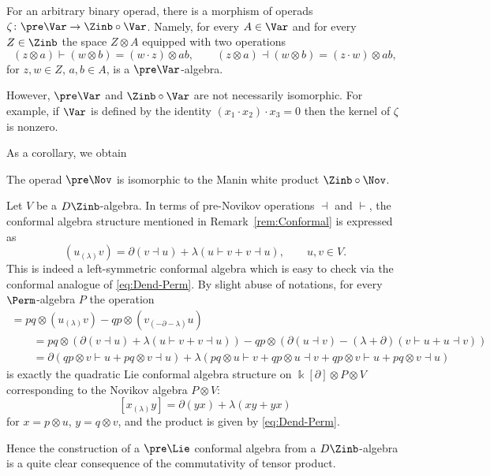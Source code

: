 \begin{Remark}
For an arbitrary binary operad,
there is a morphism of operads
$\zeta\colon \pre\Var \to \Zinb\circ \Var $. Namely,
for every $A\in \Var $ and for every $Z\in \Zinb$
the space $Z\otimes A$ equipped with two operations
\[
(z\otimes a)\vdash (w\otimes b) = (w\cdot z)\otimes ab,
\qquad
(z\otimes a)\dashv (w\otimes b) = (z\cdot w)\otimes ab,
\]
for $z,w\in Z$, $a,b\in A$, is a $\pre\Var $-algebra.

However, $\pre\Var $ and $\Zinb\circ \Var $ are
not necessarily isomorphic. For example,
if $\Var $ is defined by the identity $(x_1\cdot x_2)\cdot x_3=0$
then the kernel of $\zeta $ is nonzero.
\end{Remark}

As a corollary, we obtain

\begin{Proposition}%
The operad $\pre\Nov $
is isomorphic to the Manin white product $\Zinb\circ \Nov$.
\end{Proposition}

\begin{Remark}
Let $V$ be a $D\Zinb$-algebra.
In terms of pre-Novikov operations $\dashv$ and $\vdash$, the conformal algebra structure mentioned in
Remark~\ref{rem:Conformal} is expressed as
\[
(u_{(\lambda)} v) = \partial (v\dashv u) + \lambda (u\vdash v + v\dashv u),
\qquad u,v\in V.
\]
This is indeed a left-symmetric conformal algebra which is easy
to check via the conformal analogue of \eqref{eq:Dend-Perm}.
By slight abuse of notations,
for every $\Perm $-algebra $P$ the operation
%
\begin{gather*}
[(p\otimes u)_{(\lambda) } (q\otimes v)]
= pq \otimes (u_{(\lambda )} v) - qp\otimes (v_{(-\partial-\lambda )} u) \\
\qquad{}=pq\otimes (\partial (v\dashv u) + \lambda (u\vdash v + v\dashv u))
-qp\otimes (\partial (u\dashv v) - (\lambda+\partial) (v\vdash u + u\dashv v))\\
\qquad{}=\partial (qp\otimes v\vdash u+pq\otimes v\dashv u)
+\lambda (pq\otimes u\vdash v +qp\otimes u\dashv v
+ qp\otimes v\vdash u + pq\otimes v\dashv u)
\end{gather*}
%
is exactly the quadratic Lie conformal algebra structure \cite{Xu1999}
on $\Bbbk [\partial ]\otimes P\otimes V$
corresponding to the Novikov algebra $P\otimes V$:
\[
[x_{(\lambda )} y] = \partial (y x) + \lambda (x y + y x)
\]
for $x=p\otimes u$, $y=q\otimes v$, and the product
is given by \eqref{eq:Dend-Perm}.

Hence the construction of a $\pre\Lie$ conformal algebra from a
$D\Zinb $-algebra is a quite clear consequence of
the commutativity of tensor product.
\end{Remark}

